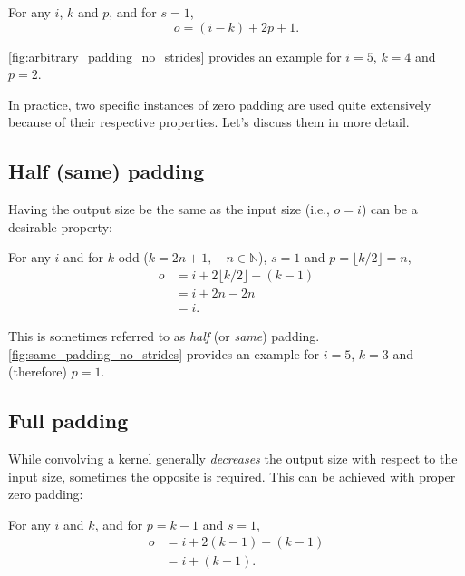 \begin{relationship}\label{rel:arbitrary_padding_no_strides}
For any $i$, $k$ and $p$, and for $s = 1$,
\begin{equation*}
    o = (i - k) + 2p + 1.
\end{equation*}
\end{relationship}

\noindent \autoref{fig:arbitrary_padding_no_strides} provides an example for $i
= 5$, $k = 4$ and $p = 2$.

In practice, two specific instances of zero padding are used quite extensively
because of their respective properties. Let's discuss them in more detail.

\subsection{Half (same) padding}

Having the output size be the same as the input size (i.e., $o = i$) can be a
desirable property:

\begin{relationship}\label{rel:same_padding_no_strides}
For any $i$ and for $k$ odd ($k = 2n + 1, \quad n \in \mathbb{N}$), $s = 1$ and
$p = \lfloor k / 2 \rfloor = n$,
\begin{equation*}
\begin{split}
    o &= i + 2 \lfloor k / 2 \rfloor - (k - 1) \\
      &= i + 2n - 2n \\
      &= i.
\end{split}
\end{equation*}
\end{relationship}

\noindent This is sometimes referred to as {\em half\/} (or {\em same\/})
padding. \autoref{fig:same_padding_no_strides} provides an example for
$i = 5$, $k = 3$ and (therefore) $p = 1$.

\subsection{Full padding}

While convolving a kernel generally {\em decreases\/} the output size with
respect to the input size, sometimes the opposite is required. This can be
achieved with proper zero padding:

\begin{relationship}\label{rel:full_padding_no_strides}
For any $i$ and $k$, and for $p = k - 1$ and $s = 1$,
\begin{equation*}
\begin{split}
    o &= i + 2(k - 1) - (k - 1) \\
      &= i + (k - 1).
\end{split}
\end{equation*}
\end{relationship}

